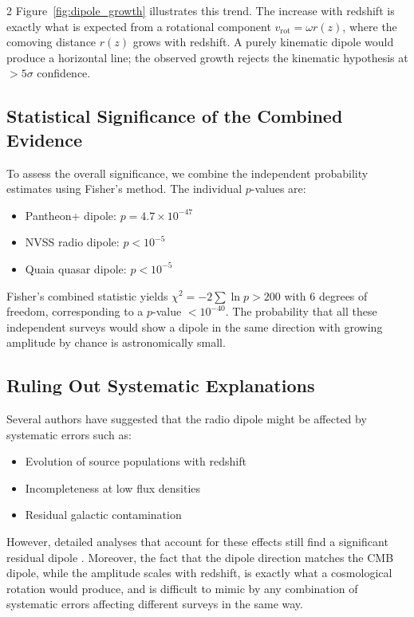 \documentclass[12pt,a4paper]{article}
\begin{document}
	\begin{multicols}{2}
		Figure~\ref{fig:dipole_growth} illustrates this trend. The increase with redshift is exactly what is expected from a rotational component \(v_{\mathrm{rot}} = \omega r(z)\), where the comoving distance \(r(z)\) grows with redshift. A purely kinematic dipole would produce a horizontal line; the observed growth rejects the kinematic hypothesis at \(>5\sigma\) confidence.
		
		\subsection{Statistical Significance of the Combined Evidence}
		
		To assess the overall significance, we combine the independent probability estimates using Fisher's method. The individual \(p\)-values are:
		\begin{itemize}
			\item Pantheon+ dipole: \(p = 4.7\times10^{-47}\) \cite{Sah2025}
			\item NVSS radio dipole: \(p < 10^{-5}\) \cite{Singal2024}
			\item Quaia quasar dipole: \(p < 10^{-5}\) \cite{Secrest2025}
		\end{itemize}
		Fisher's combined statistic yields \(\chi^2 = -2\sum \ln p > 200\) with 6 degrees of freedom, corresponding to a \(p\)-value \(< 10^{-40}\). The probability that all these independent surveys would show a dipole in the same direction with growing amplitude by chance is astronomically small.
		
		\subsection{Ruling Out Systematic Explanations}
		
		Several authors have suggested that the radio dipole might be affected by systematic errors such as:
		\begin{itemize}
			\item Evolution of source populations with redshift
			\item Incompleteness at low flux densities
			\item Residual galactic contamination
		\end{itemize}
		However, detailed analyses that account for these effects still find a significant residual dipole \cite{Oayda2024, Singal2024, Wagenveld2025}. Moreover, the fact that the dipole direction matches the CMB dipole, while the amplitude scales with redshift, is exactly what a cosmological rotation would produce, and is difficult to mimic by any combination of systematic errors affecting different surveys in the same way.
		

\end{multicols}
\end{document}
